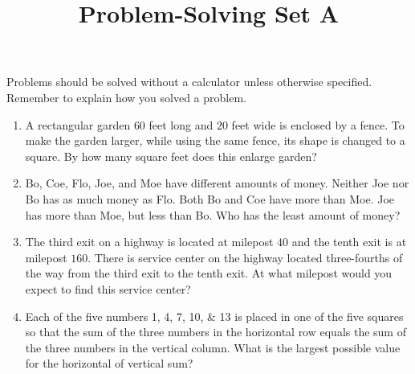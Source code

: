 \documentclass{article}
\title{Problem-Solving Set A}
\author{}
\date{}
\begin{document}
\maketitle
\noindent Problems should be solved without a calculator unless otherwise specified.
Remember to explain how you solved a problem.
\begin{multicols}{2}
    \begin{enumerate}
        \item A rectangular garden $60$ feet long and $20$ feet wide is enclosed by a fence.
            To make the garden larger, while using the same fence, its shape is changed to a square.
            By how many square feet does this enlarge garden?
            \vspace{3cm}
        \item Bo, Coe, Flo, Joe, and Moe have different amounts of money.
            Neither Joe nor Bo has as much money as Flo.
            Both Bo and Coe have more than Moe.
            Joe has more than Moe, but less than Bo.
            Who has the least amount of money?
            \vspace{3cm}
        \item The third exit on a highway is located at milepost $40$ and the tenth exit is at milepost $160$.
            There is service center on the highway located three-fourths of the way from the third exit to the tenth exit.
            At what milepost would you expect to find this service center?
            \vspace{3cm}
        \item Each of the five numbers \numlist{1;4;7;10;13} is placed in one of the five squares so that the sum of the three numbers in the horizontal row equals the sum of the three numbers in the vertical column.
            What is the largest possible value for the horizontal of vertical sum?
            \begin{center}
\end{center}
\end{enumerate}
\end{multicols}
\end{document}
